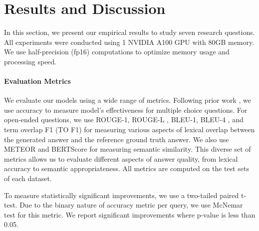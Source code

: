 \section{Results and Discussion}
In this section, we present our empirical results to study seven research questions. All experiments were conducted using 1 NVIDIA A100 GPU with 80GB memory. We use half-precision (fp16) computations to optimize memory usage and processing speed.

\paragraph{\textbf{Evaluation Metrics}} We evaluate our models using a wide range of metrics. Following prior work \cite{garcia2020knowit,wu2021transferring}, we use accuracy to measure model's effectiveness for multiple choice questions. For open-ended questions, we use ROUGE-1, ROUGE-L \cite{lin-2004-rouge}, BLEU-1, BLEU-4 \cite{papineni2002bleu}, and term overlap F1 (TO F1) \cite{Kong2013} for measuring various aspects of lexical overlap between the generated answer and the reference ground truth answer. We also use METEOR \cite{banerjee2005meteor} and BERTScore \cite{zhang2019bertscore} for measuring semantic similarity. This diverse set of metrics allows us to evaluate different aspects of answer quality, from lexical accuracy to semantic appropriateness. All metrics are computed on the test sets of each dataset.

To measure statistically significant improvements, we use a two-tailed paired t-test. Due to the binary nature of accuracy metric per query, we use McNemar test for this metric.
We report significant improvements where p-value is less than 0.05.



